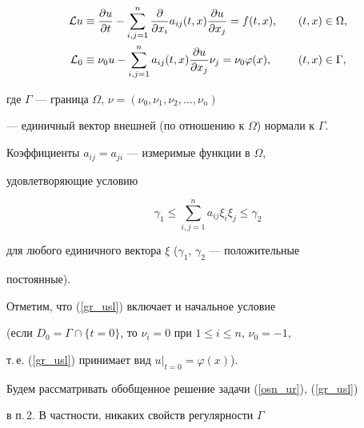 \begin{alignat}{2}


\label{osn_ur}


{\cal L}u&\equiv


\frac{\partial u}{\partial t}-


\sum_{i,j=1}^n \frac{\partial}{\partial x_i} a_{ij}(t,x)


\frac{\partial u}{\partial x_j} = f(t,x), &\quad (t,x)&\in\Omega, \\


%


\label{gr_usl}


{\cal L}_0&\equiv


\nu_0 u -\sum_{i,j=1}^n a_{ij}(t,x)


\frac{\partial u}{\partial x_j} \nu_j =\nu_0 \varphi (x), &\quad


(t,x)&\in \Gamma,


\end{alignat} 


где $\Gamma$ --- граница $\Omega$, $\nu=(\nu_0,\nu_1,\nu_2,\dotsc,\nu_n)$ 


--- единичный вектор внешней (по отношению к $\Omega$) нормали к $\Gamma$.


Коэффициенты $a_{ij}=a_{ji}$ --- измеримые функции в $\Omega$, 


удовлетворяющие условию


\begin{equation}


\label{usl_parab}


\gamma_1 \leq \sum_{i,j=1}^n a_{ij}\xi_i\xi_j \leq \gamma_2


\end{equation}


для любого единичного вектора $\xi$ ($\gamma_1$, $\gamma_2$ --- положительные 


постоянные).


 


Отметим, что (\ref{gr_usl}) включает и начальное условие


(если $D_0=\Gamma\cap\{ t=0\}$, то $\nu_i=0$ при $1\le i\leq n$, $\nu_0=-1$,


т.\,е. (\ref{gr_usl}) принимает вид $u|_{t=0}=\varphi(x)$).


 


Будем рассматривать обобщенное решение задачи (\ref{osn_ur}), (\ref{gr_usl})


в п.\,2. В частности, никаких свойств регулярности $\Gamma$


